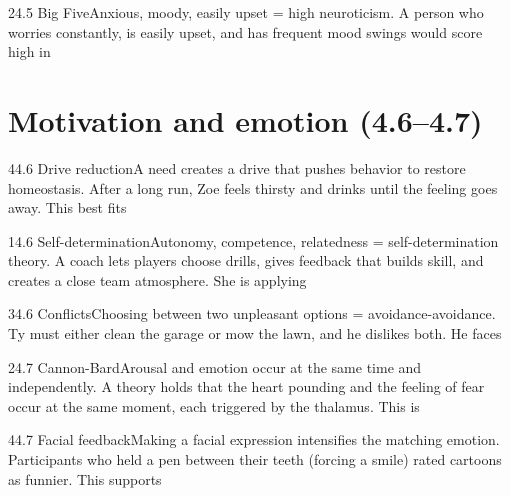 \documentclass[11pt]{article}
\begin{document}
\begin{q}{2}{4.5 Big Five}{Anxious, moody, easily upset = high neuroticism.}
A person who worries constantly, is easily upset, and has frequent mood swings would score high in
\end{q}

\section{Motivation and emotion (4.6--4.7)}

\begin{q}{4}{4.6 Drive reduction}{A need creates a drive that pushes behavior to restore homeostasis.}
After a long run, Zoe feels thirsty and drinks until the feeling goes away. This best fits
\end{q}

\begin{q}{1}{4.6 Self-determination}{Autonomy, competence, relatedness = self-determination theory.}
A coach lets players choose drills, gives feedback that builds skill, and creates a close team atmosphere. She is applying
\end{q}

\begin{q}{3}{4.6 Conflicts}{Choosing between two unpleasant options = avoidance-avoidance.}
Ty must either clean the garage or mow the lawn, and he dislikes both. He faces
\end{q}

\begin{q}{2}{4.7 Cannon-Bard}{Arousal and emotion occur at the same time and independently.}
A theory holds that the heart pounding and the feeling of fear occur at the same moment, each triggered by the thalamus. This is
\end{q}

\begin{q}{4}{4.7 Facial feedback}{Making a facial expression intensifies the matching emotion.}
Participants who held a pen between their teeth (forcing a smile) rated cartoons as funnier. This supports
\end{q}
\end{document}

